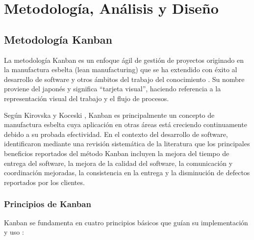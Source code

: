 \chapter{Metodología, Análisis y Diseño}

\section{Metodología Kanban} \label{sec:metodologia-kanban}

La metodología Kanban es un enfoque ágil de gestión de proyectos originado en la manufactura esbelta (lean manufacturing) que se ha 
extendido con éxito al desarrollo de software y otros ámbitos del trabajo del conocimiento \cite{kirovska2015}. Su nombre 
proviene del japonés y significa ``tarjeta visual'', haciendo referencia a la representación visual del trabajo y el flujo de procesos.

Según Kirovska y Koceski \cite{kirovska2015}, Kanban es principalmente un concepto de manufactura esbelta cuya aplicación en 
otras áreas está creciendo continuamente debido a su probada efectividad. En el contexto del desarrollo de software, identificaron mediante una revisión sistemática de la literatura que los principales beneficios 
reportados del método Kanban incluyen la mejora del tiempo de entrega del software, la mejora de la calidad del software, 
la comunicación y coordinación mejoradas, la consistencia en la entrega y la disminución de defectos reportados por los clientes.

\subsection{Principios de Kanban}

Kanban se fundamenta en cuatro principios básicos que guían su implementación y uso \cite{djaa2021}:

